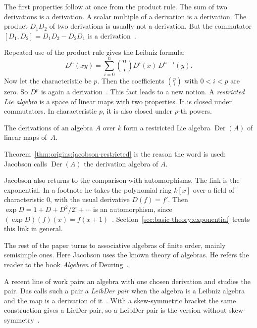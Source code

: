 The first properties follow at once from the product rule. The sum of two derivations is a derivation. A scalar multiple of a
derivation is a derivation. The product $D_1D_2$ of two derivations is
usually not a derivation. But the commutator $[D_1,D_2] = D_1D_2 - D_2D_1$ is
a derivation~\cite[p.~207]{Jacobson1937}.

Repeated use of the product rule gives the Leibniz formula:
\[
D^n(xy) = \sum_{i=0}^{n} \binom{n}{i} D^{i}(x)\, D^{n-i}(y).
\]
Now let the characteristic be $p$. Then the coefficients $\binom{p}{i}$ with
$0 < i < p$ are zero. So $D^p$ is again a
derivation~\cite[p.~207, (7)--(8)]{Jacobson1937}. This fact leads to a new
notion. A \emph{restricted Lie algebra} is a space of linear maps with two
properties. It is closed under commutators. In characteristic $p$, it is also
closed under $p$-th powers.

\begin{theorem}\label{thm:origins:jacobson-restricted}
The derivations of an algebra $A$ over $k$ form a restricted Lie algebra
$\operatorname{Der}(A)$ of linear maps of~$A$.
\end{theorem}

Theorem~\ref{thm:origins:jacobson-restricted} is the reason the word is used:
Jacobson calls $\operatorname{Der}(A)$ the derivation algebra of $A$.

Jacobson also returns to the comparison with automorphisms. The link is the
exponential. In a footnote he takes the polynomial ring $k[x]$ over a field
of characteristic $0$, with the usual derivative $D(f) = f'$. Then
$\exp D = 1 + D + D^2/2! + \cdots$ is an automorphism, since
$(\exp D)(f)(x) = f(x+1)$~\cite[p.~206, footnote]{Jacobson1937}.
Section~\ref{sec:basic-theory:exponential} treats this link in general.

The rest of the paper turns to associative algebras of finite order, mainly
semisimple ones. Here Jacobson uses the known theory of algebras. He refers
the reader to the book \emph{Algebren} of Deuring~\cite[p.~206]{Jacobson1937}.

A recent line of work pairs an algebra with one chosen derivation and studies
the pair. Das calls such a pair a \emph{LeibDer pair} when the algebra is a
Leibniz algebra and the map is a derivation of
it~\cite[\S 3, p.~4]{Das2021LeibDer}. With a skew-symmetric bracket the same
construction gives a LieDer pair, so a LeibDer pair is the version without
skew-symmetry~\cite[\S 3, p.~4]{Das2021LeibDer}.

